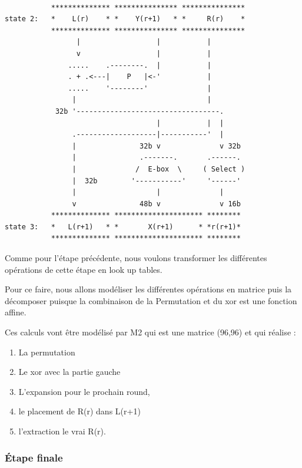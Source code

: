 \documentclass[a4paper,12pt]{article}
\begin{document}
\begin{Verbatim}[samepage=true]

           ************** *************** ***************
state 2:   *    L(r)    * *    Y(r+1)   * *     R(r)    *
           ************** *************** ***************
                 |                  |           |
                 v                  |           |
               .....    .--------.  |           |
               . + .<---|    P   |<-'           |
               .....    '--------'              |
                |                               |
            32b '----------------------------------.
                                    |           |  |
                .-------------------|-----------'  |
                |               32b v              v 32b
                |               .-------.       .------.
                |              /  E-box  \     ( Select )
                |  32b        '-----------'     '------'
                |                   |              |
                v               48b v              v 16b
           ************** ********************* ********
state 3:   *   L(r+1)   * *       X(r+1)      * *r(r+1)*
           ************** ********************* ********

\end{Verbatim}


Comme pour l'étape précédente, nous voulons transformer les différentes opérations de cette étape en look up tables.

Pour ce faire, nous allons modéliser les différentes opérations en matrice puis la décomposer puisque la combinaison de la Permutation et du xor est une fonction affine.

Ces calculs vont être modélisé par M2 qui est une matrice (96,96) et qui réalise :
\begin{enumerate}
\item La permutation
\item Le xor avec la partie gauche
\item L'expansion pour le prochain round,
\item le placement de R(r) dans L(r+1) 
\item l'extraction le vrai R(r).
\end{enumerate}



\subsubsection{Étape finale}
\end{document}
